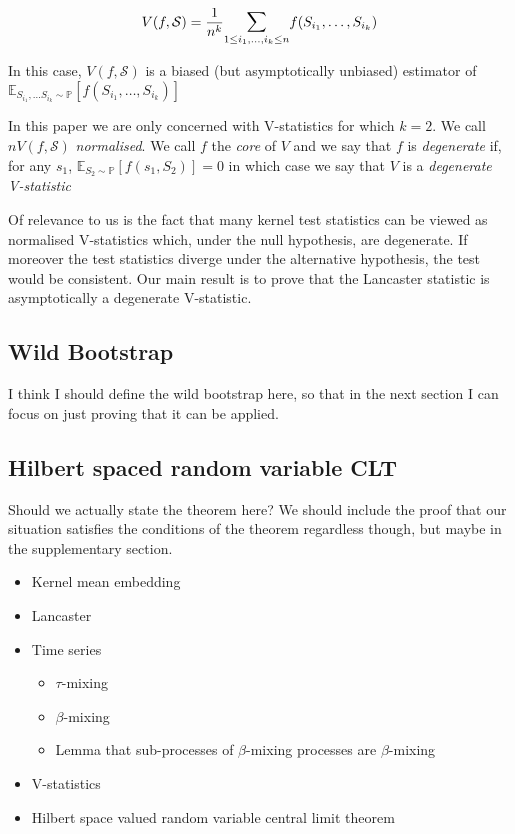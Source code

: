 \documentclass{article}
\begin{document}
\[ V(f,\mathcal{S}) =  \frac{1}{n^k} \mathlarger{\sum}_{1\leq i_1,\ldots, i_k \leq n} f(S_{i_1},\ldots,S_{i_k})\]

In this case, $V(f,\mathcal{S})$ is a biased (but asymptotically unbiased) estimator of $\mathbb{E}_{S_{i_1},\ldots S_{i_k} \sim \mathbb{P}}[f(S_{i_1},\ldots,S_{i_k})]$

In this paper we are only concerned with V-statistics for which $k=2$. We call $nV(f,\mathcal{S})$ \emph{normalised}. We call $f$ the \emph{core} of $V$ and we say that $f$ is \emph{degenerate} if, for any $s_1$, $\mathbb{E}_{S_2 \sim \mathbb{P}}[f(s_1,S_2)] = 0$ in which case we say that $V$ is a \emph{degenerate V-statistic} 

Of relevance to us is the fact that many kernel test statistics can be viewed as normalised V-statistics which, under the null hypothesis, are degenerate. If moreover the test statistics diverge under the alternative hypothesis, the test would be consistent. Our main result is to prove that the Lancaster statistic is asymptotically a degenerate V-statistic.

\subsection{Wild Bootstrap}

I think I should define the wild bootstrap here, so that in the next section I can focus on just proving that it can be applied.


\subsection{Hilbert spaced random variable CLT}

Should we actually state the theorem here? We should include the proof that our situation satisfies the conditions of the theorem regardless though, but maybe in the supplementary section.


\begin{itemize}
\item Kernel mean embedding
\item Lancaster
\item Time series
\begin{itemize}
\item $\tau$-mixing
\item $\beta$-mixing
\item Lemma that sub-processes of $\beta$-mixing processes are $\beta$-mixing
\end{itemize}
\item V-statistics
\item Hilbert space valued random variable central limit theorem
\end{itemize} 
\end{document}
